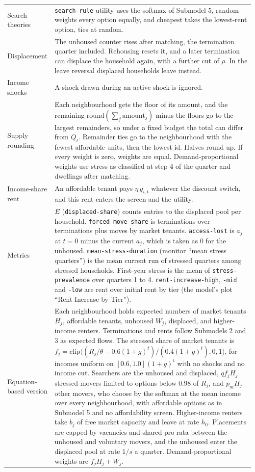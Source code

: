 \documentclass[10pt,a4paper]{article}
\begin{document}
\begin{table}[tp]
\begin{tabular}{L{3.0cm}L{11.5cm}}
Search theories & \texttt{search-rule} utility uses the softmax of Submodel 5, random weights every option equally, and cheapest takes the lowest-rent option, ties at random. \\
Displacement & The unhoused counter rises after matching, the termination quarter included. Rehousing resets it, and a later termination can displace the household again, with a further cut of $\rho$. In the leave reversal displaced households leave instead. \\
Income shocks & A shock drawn during an active shock is ignored. \\
Supply rounding & Each neighbourhood gets the floor of its amount, and the remaining $\mathrm{round}(\sum_j\text{amount}_j)$ minus the floors go to the largest remainders, so under a fixed budget the total can differ from $Q_t$. Remainder ties go to the neighbourhood with the fewest affordable units, then the lowest id. Halves round up. If every weight is zero, weights are equal. Demand-proportional weights use stress as classified at step 4 of the quarter and dwellings after matching. \\
Income-share rent & An affordable tenant pays $\eta\,y_{i,t}$ whatever the discount switch, and this rent enters the screen and the utility. \\
Metrics & $E$ (\texttt{displaced-share}) counts entries to the displaced pool per household. \texttt{forced-move-share} is terminations over terminations plus moves by market tenants. \texttt{access-lost} is $a_j$ at $t=0$ minus the current $a_j$, which is taken as 0 for the unhoused. \texttt{mean-stress-duration} (monitor ``mean stress quarters'') is the mean current run of stressed quarters among stressed households. First-year stress is the mean of \texttt{stress-prevalence} over quarters 1 to 4. \texttt{rent-increase-high}, \texttt{-mid} and \texttt{-low} are rent over initial rent by tier (the model's plot ``Rent Increase by Tier''). \\
Equation-based version & Each neighbourhood holds expected numbers of market tenants $H_j$, affordable tenants, unhoused $W_j$, displaced, and higher-income renters. Terminations and rents follow Submodels 2 and 3 as expected flows. The stressed share of market tenants is $f_j=\mathrm{clip}\big((R_j/\theta-0.6(1+g)^t)/(0.4(1+g)^t),0,1\big)$, for incomes uniform on $[0.6,1.0](1+g)^t$ with no shocks and no income cut. Searchers are the unhoused and displaced, $q f_jH_j$ stressed movers limited to options below 0.98 of $R_j$, and $p_mH_j$ other movers, who choose by the softmax at the mean income over every neighbourhood, with affordable options as in Submodel 5 and no affordability screen. Higher-income renters take $b_j$ of free market capacity and leave at rate $h_0$. Placements are capped by vacancies and shared pro rata between the unhoused and voluntary movers, and the unhoused enter the displaced pool at rate $1/s$ a quarter. Demand-proportional weights are $f_jH_j+W_j$. \\
\bottomrule
\end{tabular}
\end{table}
\end{document}
